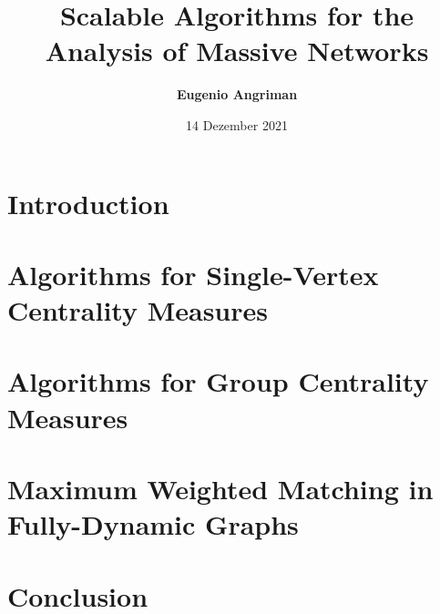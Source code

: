 \documentclass{mimosis}
\title{\textbf{Scalable Algorithms for the Analysis of Massive Networks}}
\author{\textbf{Eugenio Angriman}}
\date{14 Dezember 2021}
\begin{document}
\frontmatter


\cleardoublepage


\cleardoublepage

\cleardoublepage


\cleardoublepage
\tableofcontents
\vfill
\pagebreak
\listoffigures
\vfill
\pagebreak
\listoftables
\vfill
\pagebreak

\mainmatter

\part{Introduction}


\part{Algorithms for Single-Vertex Centrality Measures}
\label{part:single-vertex-centrality}




\part{Algorithms for Group Centrality Measures}
\label{part:group-centrality}




\part{Maximum Weighted Matching in Fully-Dynamic Graphs}
\label{part:matching}


\part{Conclusion}
\label{part:conclusion}


\begin{appendices}








\end{appendices}

\backmatter
\begingroup
    \let\clearpage\relax
    \glsaddall
    \printglossary[type=\acronymtype]
    \newpage
    \printglossary
\endgroup
\printindex
\printbibliography
\end{document}
